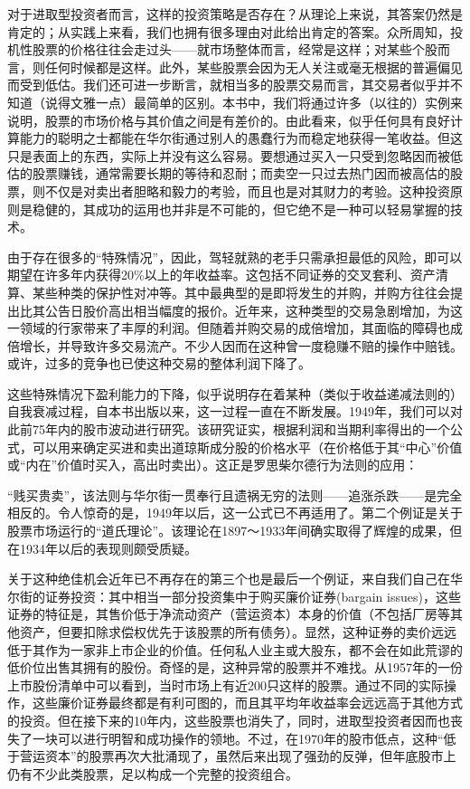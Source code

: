 \documentclass[12pt,oneside]{book}
\begin{document}
对于进取型投资者而言，这样的投资策略是否存在？从理论上来说，其答案仍然是肯定的；从实践上来看，我们也拥有很多理由对此给出肯定的答案。众所周知，投机性股票的价格往往会走过头——就市场整体而言，经常是这样；对某些个股而言，则任何时候都是这样。此外，某些股票会因为无人关注或毫无根据的普遍偏见而受到低估。我们还可进一步断言，就相当多的股票交易而言，其交易者似乎并不知道（说得文雅一点）最简单的区别。本书中，我们将通过许多（以往的）实例来说明，股票的市场价格与其价值之间是有差价的。由此看来，似乎任何具有良好计算能力的聪明之士都能在华尔街通过别人的愚蠢行为而稳定地获得一笔收益。但这只是表面上的东西，实际上并没有这么容易。要想通过买入一只受到忽略因而被低估的股票赚钱，通常需要长期的等待和忍耐；而卖空一只过去热门因而被高估的股票，则不仅是对卖出者胆略和毅力的考验，而且也是对其财力的考验。这种投资原则是稳健的，其成功的运用也并非是不可能的，但它绝不是一种可以轻易掌握的技术。

由于存在很多的“特殊情况”，因此，驾轻就熟的老手只需承担最低的风险，即可以期望在许多年内获得20\%以上的年收益率。这包括不同证券的交叉套利、资产清算、某些种类的保护性对冲等。其中最典型的是即将发生的并购，并购方往往会提出比其公告日股价高出相当幅度的报价。近年来，这种类型的交易急剧增加，为这一领域的行家带来了丰厚的利润。但随着并购交易的成倍增加，其面临的障碍也成倍增长，并导致许多交易流产。不少人因而在这种曾一度稳赚不赔的操作中赔钱。或许，过多的竞争也已使这种交易的整体利润下降了。

这些特殊情况下盈利能力的下降，似乎说明存在着某种（类似于收益递减法则的）自我衰减过程，自本书出版以来，这一过程一直在不断发展。1949年，我们可以对此前75年内的股市波动进行研究。该研究证实，根据利润和当期利率得出的一个公式，可以用来确定买进和卖出道琼斯成分股的价格水平（在价格低于其“中心”价值或“内在”价值时买入，高出时卖出）。这正是罗思柴尔德行为法则的应用：

“贱买贵卖”，该法则与华尔街一贯奉行且遗祸无穷的法则——追涨杀跌——是完全相反的。令人惊奇的是，1949年以后，这一公式已不再适用了。第二个例证是关于股票市场运行的“道氏理论”。该理论在1897～1933年间确实取得了辉煌的成果，但在1934年以后的表现则颇受质疑。

关于这种绝佳机会近年已不再存在的第三个也是最后一个例证，来自我们自己在华尔街的证券投资：其中相当一部分投资集中于购买廉价证券(bargain issues)，这些证券的特征是，其售价低于净流动资产（营运资本）本身的价值（不包括厂房等其他资产，但要扣除求偿权优先于该股票的所有债务）。显然，这种证券的卖价远远低于其作为一家非上市企业的价值。任何私人业主或大股东，都不会在如此荒谬的低价位出售其拥有的股份。奇怪的是，这种异常的股票并不难找。从1957年的一份上市股份清单中可以看到，当时市场上有近200只这样的股票。通过不同的实际操作，这些廉价证券最终都是有利可图的，而且其平均年收益率会远远高于其他方式的投资。但在接下来的10年内，这些股票也消失了，同时，进取型投资者因而也丧失了一块可以进行明智和成功操作的领地。不过，在1970年的股市低点，这种“低于营运资本”的股票再次大批涌现了，虽然后来出现了强劲的反弹，但年底股市上仍有不少此类股票，足以构成一个完整的投资组合。
\end{document}
